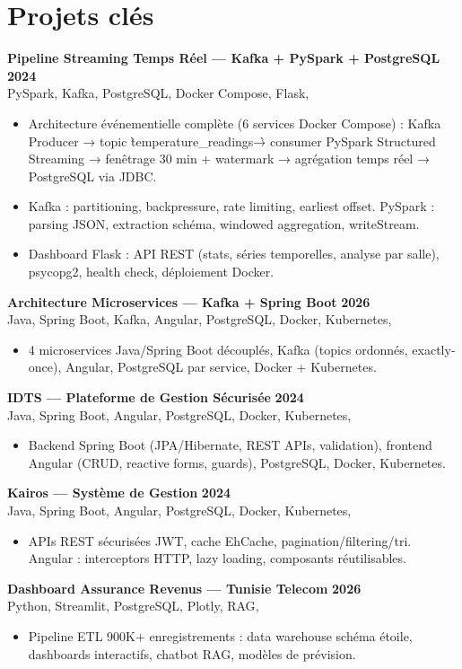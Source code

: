 \documentclass[a4paper,10pt]{article}
\newcommand{\cventry}[4]{\textbf{#1} \hfill \textbf{#4}\\[0.5pt]#2{\ifx\relax#3\relax\else, #3\fi}\par\vspace{1pt}}
\begin{document}
\section{Projets clés}
\cventry{Pipeline Streaming Temps Réel --- Kafka + PySpark + PostgreSQL}{PySpark, Kafka, PostgreSQL, Docker Compose, Flask}{}{2024}
\begin{itemize}
  \item Architecture événementielle complète (6 services Docker Compose) : Kafka Producer → topic \`temperature\_readings\` → consumer PySpark Structured Streaming → fenêtrage 30 min + watermark → agrégation temps réel → PostgreSQL via JDBC.
  \item Kafka : partitioning, backpressure, rate limiting, earliest offset. PySpark : parsing JSON, extraction schéma, windowed aggregation, writeStream.
  \item Dashboard Flask : API REST (stats, séries temporelles, analyse par salle), psycopg2, health check, déploiement Docker.
\end{itemize}
\cventry{Architecture Microservices --- Kafka + Spring Boot}{Java, Spring Boot, Kafka, Angular, PostgreSQL, Docker, Kubernetes}{}{2026}
\begin{itemize}
  \item 4 microservices Java/Spring Boot découplés, Kafka (topics ordonnés, exactly-once), Angular, PostgreSQL par service, Docker + Kubernetes.
\end{itemize}
\cventry{IDTS --- Plateforme de Gestion Sécurisée}{Java, Spring Boot, Angular, PostgreSQL, Docker, Kubernetes}{}{2024}
\begin{itemize}
  \item Backend Spring Boot (JPA/Hibernate, REST APIs, validation), frontend Angular (CRUD, reactive forms, guards), PostgreSQL, Docker, Kubernetes.
\end{itemize}
\cventry{Kairos --- Système de Gestion}{Java, Spring Boot, Angular, PostgreSQL, Docker, Kubernetes}{}{2024}
\begin{itemize}
  \item APIs REST sécurisées JWT, cache EhCache, pagination/filtering/tri. Angular : interceptors HTTP, lazy loading, composants réutilisables.
\end{itemize}
\cventry{Dashboard Assurance Revenus --- Tunisie Telecom}{Python, Streamlit, PostgreSQL, Plotly, RAG}{}{2026}
\begin{itemize}
  \item Pipeline ETL 900K+ enregistrements : data warehouse schéma étoile, dashboards interactifs, chatbot RAG, modèles de prévision.
\end{itemize}
\end{document}
